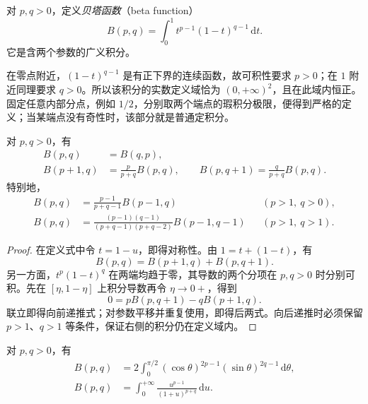 \begin{definition}[贝塔函数]
\label{def:beta-euler-integral}
对 $p,q>0$，定义\emph{贝塔函数}（beta function）
\begin{equation}
    B(p,q)=\int_0^1 t^{p-1}(1-t)^{q-1}\,\mathrm{d}t.
    \label{eq:beta-euler-integral}
\end{equation}
它是含两个参数的广义积分。
\end{definition}

在零点附近，$(1-t)^{q-1}$ 是有正下界的连续函数，故可积性要求 $p>0$；在 $1$ 附近同理要求 $q>0$。所以该积分的实数定义域恰为 $(0,+\infty)^2$，且在此域内恒正。固定任意内部分点，例如 $1/2$，分别取两个端点的瑕积分极限，便得到严格的定义；当某端点没有奇性时，该部分就是普通定积分。

\begin{proposition}[对称性与递推公式]
\label{prop:beta-symmetry-recurrence}
对 $p,q>0$，有
\begin{align}
    B(p,q)&=B(q,p),\label{eq:beta-symmetry}\\
    B(p+1,q)&=\frac{p}{p+q}B(p,q),\qquad
    B(p,q+1)=\frac{q}{p+q}B(p,q).
    \label{eq:beta-forward-recurrence}
\end{align}
特别地，
\begin{align}
    B(p,q)&=\frac{p-1}{p+q-1}B(p-1,q)
        &&(p>1,\ q>0),\label{eq:beta-backward-recurrence}\\
    B(p,q)&=\frac{(p-1)(q-1)}{(p+q-1)(p+q-2)}B(p-1,q-1)
        &&(p>1,\ q>1).\label{eq:beta-double-recurrence}
\end{align}
\end{proposition}

\begin{proof}
在定义式中令 $t=1-u$，即得对称性。由 $1=t+(1-t)$，有
\[
    B(p,q)=B(p+1,q)+B(p,q+1).
\]
另一方面，$t^p(1-t)^q$ 在两端均趋于零，其导数的两个分项在 $p,q>0$ 时分别可积。先在 $[\eta,1-\eta]$ 上积分导数再令 $\eta\to0+$，得到
\[
    0=pB(p,q+1)-qB(p+1,q).
\]
联立即得向前递推式；对参数平移并重复使用，即得后两式。向后递推时必须保留 $p>1$、$q>1$ 等条件，保证右侧的积分仍在定义域内。
\end{proof}

\begin{proposition}[三角形式与无穷积分形式]
\label{prop:beta-alternative-integrals}
对 $p,q>0$，有
\begin{align}
    B(p,q)&=2\int_0^{\pi/2}
       (\cos\theta)^{2p-1}(\sin\theta)^{2q-1}\,\mathrm{d}\theta,
       \label{eq:beta-trigonometric-form}\\
    B(p,q)&=\int_0^{+\infty}
       \frac{u^{p-1}}{(1+u)^{p+q}}\,\mathrm{d}u.
       \label{eq:beta-infinite-form}
\end{align}
\end{proposition}

